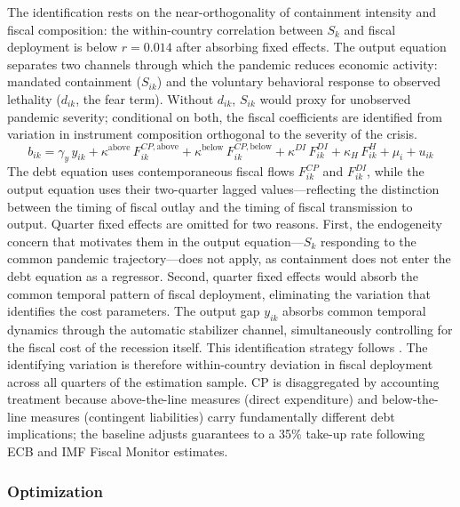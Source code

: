 \documentclass[12pt, a4paper]{article}
\begin{document}
\noindent The identification rests on the near-orthogonality of containment intensity and fiscal composition: the within-country correlation between $S_k$ and fiscal deployment is below $r = 0.014$ after absorbing fixed effects. The output equation separates two channels through which the pandemic reduces economic activity: mandated containment ($S_{ik}$) and the voluntary behavioral response to observed lethality ($d_{ik}$, the fear term). Without $d_{ik}$, $S_{ik}$ would proxy for unobserved pandemic severity; conditional on both, the fiscal coefficients are identified from variation in instrument composition orthogonal to the severity of the crisis.
%
\begin{equation}
    b_{ik} = \gamma_y\, y_{ik} + \kappa^{\text{above}}\, F_{ik}^{CP,\text{above}} + \kappa^{\text{below}}\, F_{ik}^{CP,\text{below}} + \kappa^{DI}\, F_{ik}^{DI} + \kappa_H\, F_{ik}^{H} + \mu_i + u_{ik}
\end{equation}
%
The debt equation uses contemporaneous fiscal flows $F^{CP}_{ik}$ and $F^{DI}_{ik}$, while the output equation uses their two-quarter lagged values---reflecting the distinction between the timing of fiscal outlay and the timing of fiscal transmission to output. Quarter fixed effects are omitted for two reasons. First, the endogeneity concern that motivates them in the output equation---$S_k$ responding to the common pandemic trajectory---does not apply, as containment does not enter the debt equation as a regressor. Second, quarter fixed effects would absorb the common temporal pattern of fiscal deployment, eliminating the variation that identifies the cost parameters. The output gap $y_{ik}$ absorbs common temporal dynamics through the automatic stabilizer channel, simultaneously controlling for the fiscal cost of the recession itself. This identification strategy follows \citet{deb2021}. The identifying variation is therefore within-country deviation in fiscal deployment across all quarters of the estimation sample. CP is disaggregated by accounting treatment because above-the-line measures (direct expenditure) and below-the-line measures (contingent liabilities) carry fundamentally different debt implications; the baseline adjusts guarantees to a 35\% take-up rate following ECB and IMF Fiscal Monitor estimates.

\subsubsection{Optimization}
\end{document}
